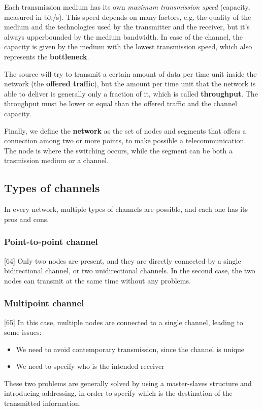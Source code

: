 \noindent Each transmission medium has its own \textit{maximum transmission speed} (capacity, measured in bit/s). This speed depends on many factors, e.g. the quality of the medium and the technologies used by the transmitter and the receiver, but it's always upperbounded by the medium bandwidth. In case of the channel, the capacity is given by the medium with the lowest transmission speed, which also represents the \textbf{bottleneck}.

The source will try to transmit a certain amount of data per time unit inside the network (the \textbf{offered traffic}), but the amount per time unit that the network is able to deliver is generally only a fraction of it, which is called \textbf{throughput}. The throughput must be lower or equal than the offered traffic and the channel capacity.

Finally, we define the \textbf{network} as the set of nodes and segments that offers a connection among two or more points, to make possible a telecommunication. The node is where the switching occurs, while the segment can be both a trasmission medium or a channel. 

\subsection{Types of channels}
In every network, multiple types of channels are possible, and each one has its pros and cons.
\subsubsection{Point-to-point channel}
[64] Only two nodes are present, and they are directly connected by a single bidirectional channel, or two unidirectional channels. In the second case, the two nodes can transmit at the same time without any problems.

\subsubsection{Multipoint channel}
[65] In this case, multiple nodes are connected to a single channel, leading to some issues:
\begin{itemize}
    \item We need to avoid contemporary transmission, since the channel is unique
    \item We need to specify who is the intended receiver
\end{itemize}

\noindent These two problems are generally solved by using a master-slaves structure and introducing addressing, in order to specify which is the destination of the transmitted information.

